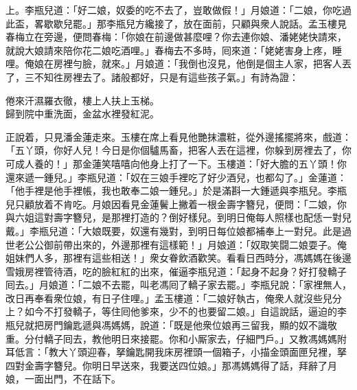 上。李瓶兒道：「好二娘，奴委的吃不去了，豈敢做假！」月娘道：「二娘，你吃過此盃，畧歇歇兒罷。」那李瓶兒方纔接了，放在面前，只顧與衆人說話。孟玉樓見春梅立在旁邊，便問春梅：「你娘在前邊做甚麼哩？{}你去連你娘、潘姥姥快請來，就說大娘請來陪你花二娘吃酒哩。」春梅去不多時，囘來道：「姥姥害身上疼，睡哩。俺娘在房裡勻臉，就來。」月娘道：「我倒也沒見，他倒是個主人家，把客人丟了，三不知徃房裡去了。諸般都好，只是有這些孩子氣。」{}有詩為證：

\begin{myquote}
倦來汗濕羅衣徹，樓上人扶上玉梯。\\歸到院中重洗面，金盆水裡發紅泥。
\end{myquote}

正說着，只見潘金蓮走來。玉樓在席上看見他艷抹濃粧，從外邊搖擺將來，戲道：「五丫頭，你好人兒！今日是你個驢馬畜，把客人丟在這裡，你躲到房裡去了，你可成人養的！」那金蓮笑嘻嘻向他身上打了一下。{}玉樓道：「好大膽的五丫頭！你還來遞一鍾兒。」李瓶兒道：「奴在三娘手裡吃了好少酒兒，也都勾了。」金蓮道：「他手裡是他手裡帳，我也敢奉二娘一鍾兒。」於是滿斟一大鍾遞與李瓶兒。李瓶兒只顧放着不肯吃。月娘因看見金蓮鬢上撇着一根金壽字簪兒，便問：「二娘，你與六姐這對壽字簪兒，是那裡打造的？倒好樣兒。到明日俺每人照樣也配恁一對兒戴。」李瓶兒道：「大娘既要，奴還有幾對，到明日每位娘都補奉上一對兒。此是過世老公公御前帶出來的，外邊那裡有這樣範！」月娘道：「奴取笑闘二娘耍子。俺姐妹們人多，那裡有這些相送！」衆女眷飲酒歡笑。看看日西時分，馮媽媽在後邊雪娥房裡管待酒，吃的臉紅紅的出來，催逼李瓶兒道：「起身不起身？好打發轎子囘去。」月娘道：「二娘不去罷，叫老馮囘了轎子家去罷。」李瓶兒說：「家裡無人，改日再奉看衆位娘，有日子住哩。」孟玉樓道：「二娘好執古，俺衆人就沒些兒分上？如今不打發轎子，等住囘他爹來，少不的也要留二娘。」{}自這說話，逼迫的李瓶兒就把房門鑰匙遞與馮媽媽，說道：「既是他衆位娘再三留我，顯的奴不識敬重。分付轎子囘去，教他明日來接罷。你和小厮家去，仔細門戶。」又教馮媽媽附耳低言：「教大丫頭迎春，拏鑰匙開我床房裡頭一個箱子，小描金頭面匣兒裡，拏四對金壽字簪兒。你明日早送來，我要送四位娘。」那馮媽媽得了話，拜辭了月娘，一面出門，不在話下。

